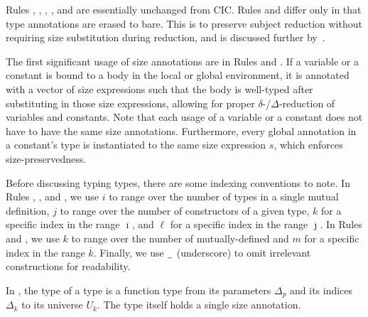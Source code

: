 Rules , , ,  , and  are essentially unchanged from CIC.
Rules  and  differ only in that type annotations are erased to bare.
This is to preserve subject reduction without requiring size substitution during reduction, and is discussed further by~\citet{cic-hat-minus}.

The first significant usage of size annotations are in Rules  and .
If a variable or a constant is bound to a body in the local or global environment, it is annotated with a vector of size expressions such that the body is well-typed after substituting in those size expressions, allowing for proper $\delta$-/$\Delta$-reduction of variables and constants.
Note that each usage of a variable or a constant does not have to have the same size annotations.
Furthermore, every global annotation in a constant's type is instantiated to the same size expression $s$, which enforces size-preservedness.

Before discussing typing \coinductive types, there are some indexing conventions to note.
In Rules , , and , we use $i$ to range over the number of \coinductive types in a single mutual \coinductive definition, $j$ to range over the number of constructors of a given \coinductive type, $k$ for a specific index in the range $\overline{\imath}$, and $\ell$ for a specific index in the range $\overline{\jmath}$.
In Rules  and , we use $k$ to range over the number of mutually-defined \cofixpoints and $m$ for a specific index in the range $\overline{k}$.
Finally, we use $\any$ (underscore) to omit irrelevant constructions for readability.

In , the type of a \coinductive type is a function type from its parameters $\Delta_p$ and its indices $\Delta_k$ to its universe $U_k$.
The \coinductive type itself holds a single size annotation.

